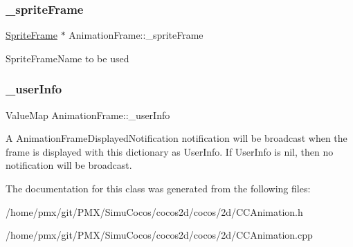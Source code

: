 \subsubsection{\texorpdfstring{\+\_\+sprite\+Frame}{\_spriteFrame}}
{\footnotesize\ttfamily \hyperlink{classSpriteFrame}{Sprite\+Frame} $\ast$ Animation\+Frame\+::\+\_\+sprite\+Frame\hspace{0.3cm}{\ttfamily [protected]}}

Sprite\+Frame\+Name to be used \mbox{\label{classAnimationFrame_aa7df71ae7201b786d7c264adb6a595b3}} 
\subsubsection{\texorpdfstring{\+\_\+user\+Info}{\_userInfo}}
{\footnotesize\ttfamily Value\+Map Animation\+Frame\+::\+\_\+user\+Info\hspace{0.3cm}{\ttfamily [protected]}}

A Animation\+Frame\+Displayed\+Notification notification will be broadcast when the frame is displayed with this dictionary as User\+Info. If User\+Info is nil, then no notification will be broadcast. 

The documentation for this class was generated from the following files\+:\begin{DoxyCompactItemize}
\item 
/home/pmx/git/\+P\+M\+X/\+Simu\+Cocos/cocos2d/cocos/2d/C\+C\+Animation.\+h\item 
/home/pmx/git/\+P\+M\+X/\+Simu\+Cocos/cocos2d/cocos/2d/C\+C\+Animation.\+cpp\end{DoxyCompactItemize}
